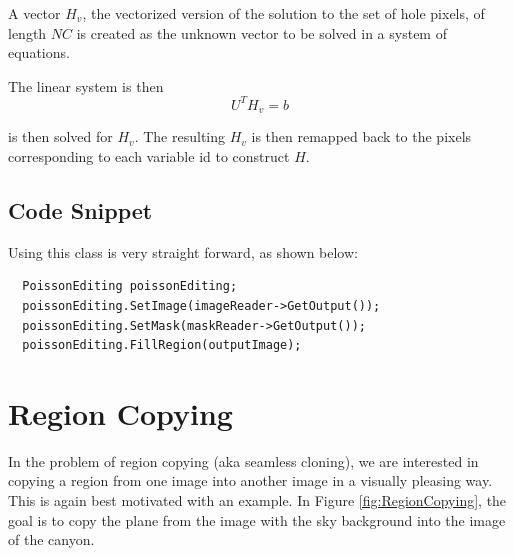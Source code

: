 \documentclass{InsightArticle}
\begin{document}
A vector $H_v$, the vectorized version of the solution to the set of hole pixels, of length $NC$ is created as the unknown vector to be solved in a system of equations.

The linear system is then
\begin{equation}
 U^T H_v = b
\end{equation}

is then solved for $H_v$. The resulting $H_v$ is then remapped back to the pixels corresponding to each variable id to construct $H$.

\subsection{Code Snippet}

Using this class is very straight forward, as shown below:

\begin{verbatim}
  PoissonEditing poissonEditing;
  poissonEditing.SetImage(imageReader->GetOutput());
  poissonEditing.SetMask(maskReader->GetOutput());
  poissonEditing.FillRegion(outputImage);
\end{verbatim}


\section{Region Copying}
In the problem of region copying (aka seamless cloning), we are interested in copying a region from one image into another image in a visually pleasing way. This is again best motivated with an example. In Figure \ref{fig:RegionCopying}, the goal is to copy the plane from the image with the sky background into the image of the canyon. 
\end{document}
